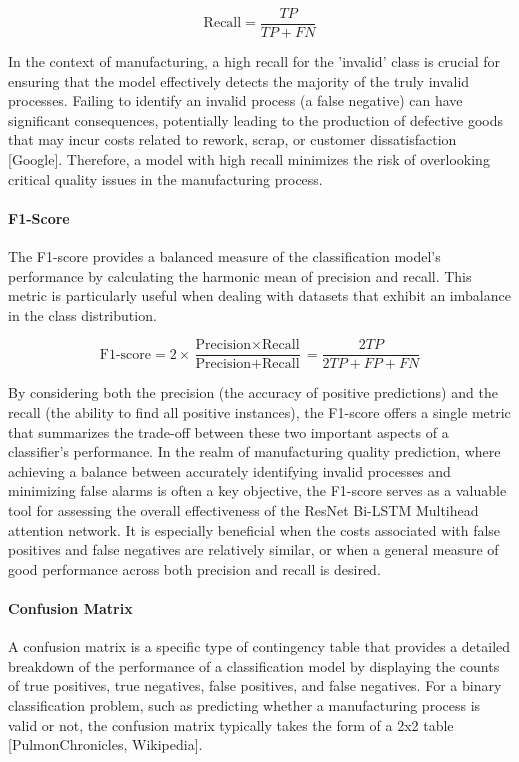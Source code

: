 \begin{equation}
  \text{Recall} = \frac{TP}{TP + FN}
\end{equation}

In the context of manufacturing, a high recall for the 'invalid' class is crucial for ensuring that the model effectively detects the majority of the truly invalid processes. Failing to identify an invalid process (a false negative) can have significant consequences, potentially leading to the production of defective goods that may incur costs related to rework, scrap, or customer dissatisfaction [Google]. Therefore, a model with high recall minimizes the risk of overlooking critical quality issues in the manufacturing process.

\paragraph{\textbf{F1-Score}}
The F1-score provides a balanced measure of the classification model's performance by calculating the harmonic mean of precision and recall. This metric is particularly useful when dealing with datasets that exhibit an imbalance in the class distribution.

\begin{equation}
  \text{F1-score} = 2 \times \frac{\text{Precision} \times \text{Recall}}{\text{Precision} + \text{Recall}} = \frac{2TP}{2TP + FP + FN}
\end{equation}

By considering both the precision (the accuracy of positive predictions) and the recall (the ability to find all positive instances), the F1-score offers a single metric that summarizes the trade-off between these two important aspects of a classifier's performance. In the realm of manufacturing quality prediction, where achieving a balance between accurately identifying invalid processes and minimizing false alarms is often a key objective, the F1-score serves as a valuable tool for assessing the overall effectiveness of the ResNet Bi-LSTM Multihead attention network. It is especially beneficial when the costs associated with false positives and false negatives are relatively similar, or when a general measure of good performance across both precision and recall is desired.

\paragraph{\textbf{Confusion Matrix}}
A confusion matrix is a specific type of contingency table that provides a detailed breakdown of the performance of a classification model by displaying the counts of true positives, true negatives, false positives, and false negatives. For a binary classification problem, such as predicting whether a manufacturing process is valid or not, the confusion matrix typically takes the form of a 2x2 table [PulmonChronicles, Wikipedia].

